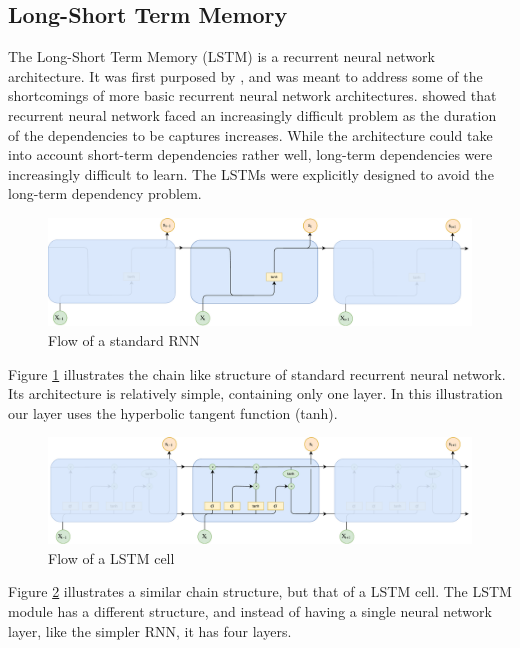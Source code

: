 \subsection{Long-Short Term Memory}
The Long-Short Term Memory (LSTM) is a recurrent neural network architecture. It was first purposed by \citep{hochreiter1997long}, and was meant to address some of the shortcomings of more basic recurrent neural network architectures. \citep{bengio1994learning} showed that recurrent neural network faced an increasingly difficult problem as the duration of the dependencies to be captures increases. While the architecture could take into account short-term dependencies rather well, long-term dependencies were increasingly difficult to learn. The LSTMs were explicitly designed to avoid the long-term dependency problem. 

\begin{figure}[ht]
    \centering
    \includegraphics[width=1\textwidth]{fig/related_work/rnn_flow.pdf}
    \caption{Flow of a standard RNN}
    \label{fig:nn-rnn-flow}
\end{figure}

Figure \ref{fig:nn-rnn-flow} illustrates the chain like structure of standard recurrent neural network. Its architecture is relatively simple, containing only one layer. In this illustration our layer uses the hyperbolic tangent function (tanh).

\begin{figure}[ht]
    \centering
    \includegraphics[width=1\textwidth]{fig/related_work/lstm_flow.pdf}
    \caption{Flow of a LSTM cell}
    \label{fig:nn-lstm-flow}
\end{figure}

Figure \ref{fig:nn-lstm-flow} illustrates a similar chain structure, but that of a LSTM cell. The LSTM module has a different structure, and instead of having a single neural network layer, like the simpler RNN, it has four layers.


